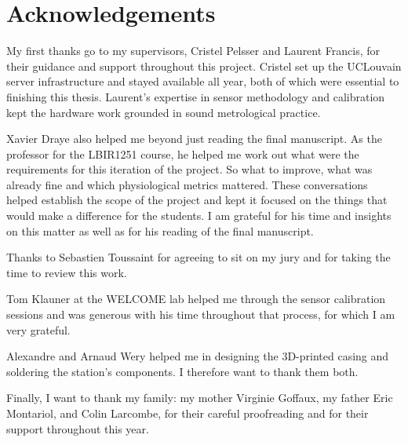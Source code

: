 ﻿\chapter*{Acknowledgements}
My first thanks go to my supervisors, Cristel Pelsser and Laurent Francis, for their guidance and support throughout this project. Cristel set up the UCLouvain server infrastructure and stayed available all year, both of which were essential to finishing this thesis. Laurent's expertise in sensor methodology and calibration kept the hardware work grounded in sound metrological practice.

Xavier Draye also helped me beyond just reading the final manuscript. As the professor for the LBIR1251 course, he helped me work out what were the requirements for this iteration of the project. So what to improve, what was already fine and which physiological metrics mattered. These conversations helped establish the scope of the project and kept it focused on the things that would make a difference for the students. I am grateful for his time and insights on this matter as well as for his reading of the final manuscript.

Thanks to Sebastien Toussaint for agreeing to sit on my jury and for taking the time to review this work.

Tom Klauner at the WELCOME lab helped me through the sensor calibration sessions and was generous with his time throughout that process, for which I am very grateful.

Alexandre and Arnaud Wery helped me in designing the 3D-printed casing and soldering the station's components. I therefore want to thank them both. 

Finally, I want to thank my family: my mother Virginie Goffaux, my father Eric Montariol, and Colin Larcombe, for their careful proofreading and for their support throughout this year.

